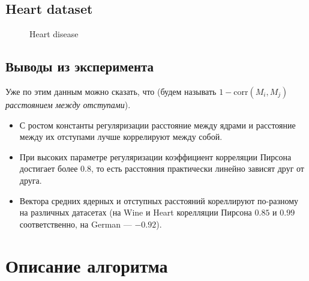\documentclass[12pt,twoside]{article}
\begin{document}



\newpage

\subsection{Heart dataset}

\begin{figure}[H]
      \caption{Heart disease}
\end{figure}



\subsection{Выводы из эксперимента}

Уже по этим данным можно сказать, что (будем называть $1 - \mathrm{corr}(M_i, M_j)$ 
\emph{расстоянием между отступами}).
\begin{itemize}
  \item С ростом константы регуляризации расстояние между ядрами и расстояние между	
  их отступами лучше коррелируют между собой.
  \item При высоких параметре регуляризации коэффициент корреляции Пирсона 
  достигает более $0.8$, то есть расстояния практически линейно зависят друг от друга.
  \item Вектора средних ядерных и отступных расстояний кореллируют по-разному на различных датасетах (на Wine и Heart корелляции Пирсона $0.85$ и $0.99$ соответственно, на German --- $-0.92$).
\end{itemize} 

\section{Описание алгоритма}
\end{document}
